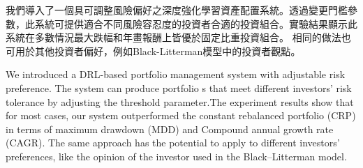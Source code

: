 \begin{abstractzh}
我們導入了一個具可調整風險偏好之深度強化學習資產配置系統。透過變更門檻參數，此系統可提供適合不同風險容忍度的投資者合適的投資組合。實驗結果顯示此系統在多數情況最大跌幅和年畫報酬上皆優於固定比重投資組合。
相同的做法也可用於其他投資者偏好，例如Black-Litterman模型中的投資者觀點\cite{black1992global}。 

\end{abstractzh}

\begin{abstracten}
We introduced a DRL-based portfolio management system with adjustable risk preference. The system can produce portfolio s that meet different investors' risk tolerance by adjusting the threshold parameter.The experiment results show that for most cases, our system outperformed the constant rebalanced portfolio (CRP) in terms of maximum drawdown (MDD) and Compound annual growth rate (CAGR). The same approach has the potential to apply to different investors' preferences, like the opinion of the investor used in the Black–Litterman model\cite{black1992global}. 
\end{abstracten}


